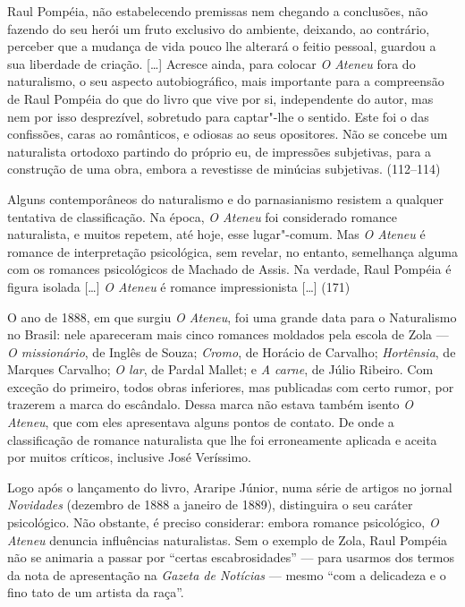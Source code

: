 Raul Pompéia, não estabelecendo premissas nem chegando a
conclusões, não fazendo do seu herói um fruto exclusivo do ambiente,
deixando, ao contrário, perceber que a mudança de vida pouco lhe
alterará o feitio pessoal, guardou a sua liberdade de criação. [\ldots]
Acresce ainda, para colocar \textit{O Ateneu} fora do naturalismo, o seu aspecto
autobiográfico, mais importante para a compreensão de Raul Pompéia
do que do livro que vive por si, independente do autor, mas nem por
isso desprezível, sobretudo para captar"-lhe o sentido. Este foi o das
confissões, caras ao românticos, e odiosas ao seus opositores. Não se
concebe um naturalista ortodoxo partindo do próprio eu, de impressões
subjetivas, para a construção de uma obra, embora a revestisse de
minúcias subjetivas. (112--114)



Alguns contemporâneos do naturalismo e do parnasianismo
resistem a qualquer tentativa de classificação. Na época,
\textit{O Ateneu} foi considerado romance
naturalista, e muitos repetem, até hoje, esse lugar"-comum. Mas
\textit{O Ateneu} é romance de interpretação
psicológica, sem revelar, no entanto, semelhança alguma com os
romances psicológicos de Machado de Assis. Na verdade, Raul Pompéia é
figura isolada [\ldots] \textit{O Ateneu} é
romance impressionista [\ldots] (171)



O ano de 1888, em que surgiu \textit{O
Ateneu}, foi uma grande data para o Naturalismo no
Brasil: nele apareceram mais cinco romances moldados pela escola de
Zola --- \textit{O missionário}, de Inglês
de Souza; \textit{Cromo}, de Horácio de
Carvalho; \textit{Hortênsia}, de Marques
Carvalho; \textit{O lar}, de Pardal Mallet;
e \textit{A carne}, de Júlio Ribeiro. Com
exceção do primeiro, todos obras inferiores, mas publicadas com certo
rumor, por trazerem a marca do escândalo. Dessa marca não estava também
isento \textit{O Ateneu}, que com eles
apresentava alguns pontos de contato. De onde a classificação de
romance naturalista que lhe foi erroneamente aplicada e aceita por
muitos críticos, inclusive José Veríssimo.

Logo após o lançamento do livro, Araripe Júnior, numa
série de artigos no jornal \textit{Novidades} (dezembro de 1888 a
janeiro de 1889), distinguira o seu caráter psicológico. Não obstante,
é preciso considerar: embora romance psicológico, \textit{O Ateneu} 
denuncia influências naturalistas. Sem o exemplo de Zola, Raul Pompéia 
não se animaria a passar por ``certas escabrosidades'' --- 
para usarmos dos termos da nota de apresentação na 
\textit{Gazeta de Notícias} --- mesmo ``com a delicadeza 
e o fino tato de um artista da raça''.

